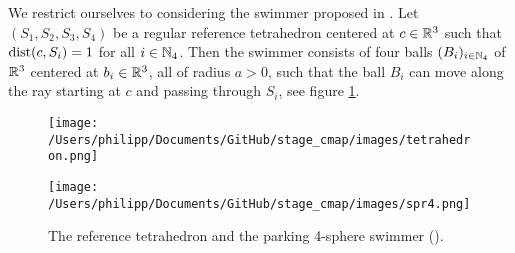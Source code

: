 \label{sec:modeling}
We restrict ourselves to considering the swimmer \spr proposed in \cite{Alouges2013}. Let $(S_1, S_2, S_3, S_4)$ be a regular reference tetrahedron centered at $c \in \mathbb{R}^3$ such that $\operatorname{dist}(c, S_i) = 1$ for all $i \in \mathbb{N}_4$. Then the swimmer consists of four balls $(B_i)_{i \in \mathbb{N}_4}$ of $\mathbb{R}^3$ centered at $b_i \in \mathbb{R}^3$, all of radius $a > 0$, such that the ball $B_i$ can move along the ray starting at $c$ and passing through $S_i$, see figure \ref{fig:reference tetrahedron and spr4}.

\begin{figure}[h]
    \centering
    \begin{minipage}{0.45\textwidth}
        \centering
        \texttt{[image: /Users/philipp/Documents/GitHub/stage\_cmap/images/tetrahedron.png]}
    \end{minipage}
    \begin{minipage}{0.45\textwidth}
        \centering
        \texttt{[image: /Users/philipp/Documents/GitHub/stage\_cmap/images/spr4.png]} %
    \end{minipage}
    \caption{The reference tetrahedron and the parking 4-sphere swimmer (\spr).}
    \label{fig:reference tetrahedron and spr4}
\end{figure}

